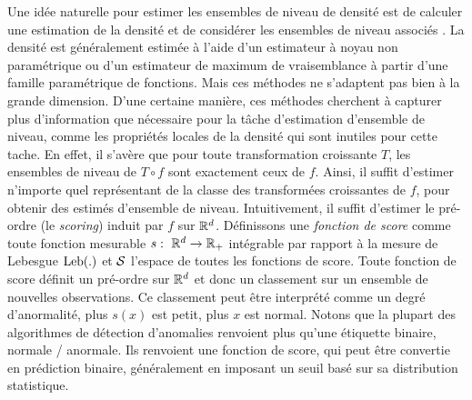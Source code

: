 
Une idée naturelle pour estimer les ensembles de niveau de densité est de calculer une estimation de la densité et de considérer les ensembles de niveau associés \citep{Tsybakov1997, Cuevas1997, Baillo2001, Baillo2003, Cadre2006, Rigollet2009, Mason2009}.
La densité est généralement estimée à l'aide d'un estimateur à noyau non paramétrique ou d'un estimateur de maximum de vraisemblance à partir d'une famille paramétrique de fonctions. Mais ces méthodes ne s'adaptent pas bien à la  grande dimension. D'une certaine manière, ces méthodes cherchent à capturer plus d'information que nécessaire pour la tâche d'estimation d'ensemble de niveau, comme les propriétés locales de la densité qui sont inutiles pour cette tache. En effet, il s'avère que pour toute transformation croissante $ T $, les ensembles de niveau de $ T \circ f $ sont exactement ceux de $ f $. Ainsi, il suffit d'estimer n'importe quel représentant de la classe des transformées croissantes de $ f $, pour obtenir des estimés d'ensemble de niveau. Intuitivement, il suffit d'estimer le pré-ordre (le \emph {scoring}) induit par $ f $ sur $ \rset ^ d $. Définissons une \emph {fonction de score} comme toute fonction mesurable $ s:~ \rset ^ d \to \rset _ + $ intégrable par rapport à la mesure de Lebesgue $ \leb (.) $ et $ \S $ l'espace de toutes les fonctions de score.
Toute fonction de score définit un pré-ordre sur $ \rset ^ d $ et donc un classement sur un ensemble de nouvelles observations. Ce classement peut être interprété comme un degré d'anormalité, plus $ s (x) $ est petit, plus $ x $ est normal. Notons que la plupart des algorithmes de détection d'anomalies renvoient plus qu'une étiquette binaire, normale / anormale. Ils renvoient une fonction de score, qui peut être convertie en prédiction binaire, généralement en imposant un seuil basé sur sa distribution statistique.


